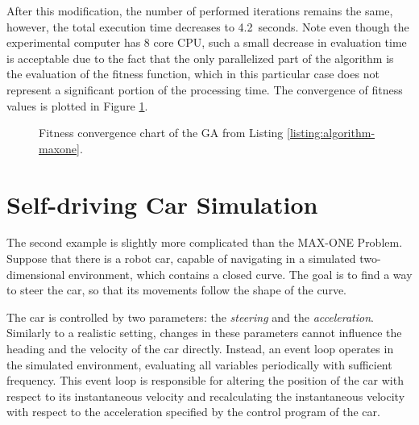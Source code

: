 After this modification, the number of performed iterations remains the same, however, the total execution time decreases to 4.2~seconds. Note even though the experimental computer has 8 core CPU, such a small decrease in evaluation time is acceptable due to the fact that the only parallelized part of the algorithm is the evaluation of the fitness function, which in this particular case does not represent a significant portion of the processing time. The convergence of fitness values is plotted in Figure \ref{fig:maxone-fitness}.

\begin{figure}[ht]
	\centering
	\caption[MAX-ONE genetic algorithm fitness convergence chart.]{Fitness convergence chart of the GA from Listing \ref{listing:algorithm-maxone}.}
	\label{fig:maxone-fitness}
\end{figure}

\section{Self-driving Car Simulation}
The second example is slightly more complicated than the MAX-ONE Problem. Suppose that there is a robot car, capable of navigating in a simulated two-dimensional environment, which contains a closed curve. The goal is to find a way to steer the car, so that its movements follow the shape of the curve.

The car is controlled by two parameters: the \textit{steering} and the \textit{acceleration}. Similarly to a realistic setting, changes in these parameters cannot influence the heading and the velocity of the car directly. Instead, an event loop operates in the simulated environment, evaluating all variables periodically with sufficient frequency. This event loop is responsible for altering the position of the car with respect to its instantaneous velocity and recalculating the instantaneous velocity with respect to the acceleration specified by the control program of the car.

